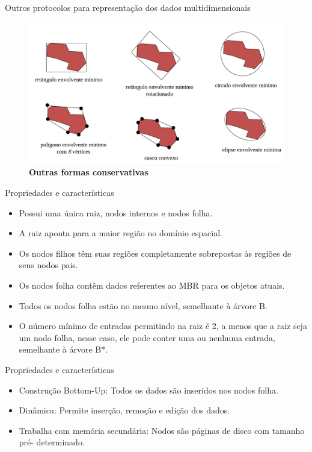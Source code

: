 \documentclass[compress,aspectratio=169]{beamer}
\begin{document}
\begin{frame}{Outros protocolos para representação dos dados multidimensionais}
\begin{figure}[]
        \centering
        \includegraphics[width=0.75\linewidth]{shapes.png}
        \caption{\textbf{Outras formas conservativas}}
        \label{fig:enter-label}
\end{figure}

\end{frame}
\begin{frame}{Propriedades e características}
    \begin{justify}
     \begin{itemize}
        \item   Possui uma única raiz, nodos internos e nodos folha.
        \item   A raiz aponta para a maior região no domínio espacial.
        \item   Os nodos filhos têm  suas regiões completamente sobrepostas às regiões de seus nodos pais.
        \item   Os nodos folha contêm dados referentes ao MBR para os objetos atuais.
        \item   Todos os nodos folha estão no mesmo nível, semelhante à árvore B.
        \item  O número mínimo de entradas permitindo na raiz é 2, a menos que a raiz seja um nodo folha, nesse caso, ele pode conter uma ou nenhuma entrada, semelhante à árvore B*.
     \end{itemize}
    \end{justify}
\end{frame}

\begin{frame}{Propriedades e características}
    \begin{justify}
     \begin{itemize}
        \item   Construção Bottom-Up: Todos os dados são inseridos nos nodos folha.
        \item   Dinâmica: Permite inserção, remoção e edição dos dados.
        \item   Trabalha com memória secundária: Nodos são páginas de disco com tamanho pré- determinado.
     \end{itemize}
    \end{justify}
\end{frame}
\end{document}
